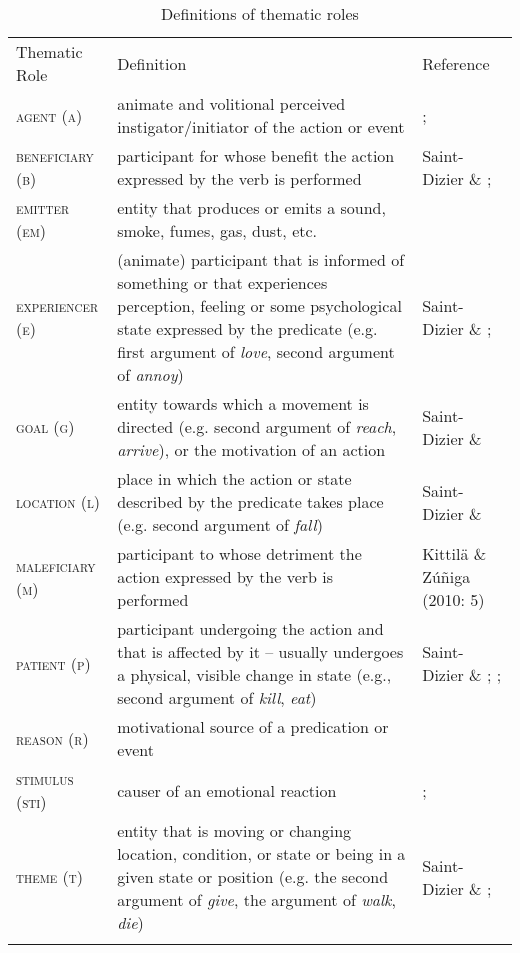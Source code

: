 \documentclass[output=paper]{langsci/langscibook}
\begin{document}
\begin{table}
\caption{Definitions of thematic roles}
\label{tab:1}

\begin{tabularx}{\textwidth}{XXX}
\lsptoprule
 {Thematic Role} & {Definition} & {Reference}\\
 {\textsc{agent (a)}} & {animate and volitional perceived instigator/initiator of the action or event} & {\citet{Fillmore1968}; \citet[49]{Payne1997}}\\
 {\textsc{beneficiary (b)}} & {participant for whose benefit the action expressed by the verb is performed} & {Saint-Dizier \& \citet[11]{Viegas1995}; \citet[4]{PalmerEtAl2010}}\\
 {\textsc{emitter (em)}} & {entity that produces or emits a sound, smoke, fumes, gas, dust, etc.} & \\
 {\textsc{experiencer (e)}} & {(animate) participant that is informed of something or that experiences perception, feeling or some psychological state expressed by the predicate (e.g. first argument of \textit{love}, second argument of \textit{annoy})} & {Saint-Dizier \& \citet[11]{Viegas1995}; \citet[113]{Lobner2002}}\\
 {\textsc{goal (g)}} & {entity towards which a movement is directed (e.g. second argument of \textit{reach}, \textit{arrive}), or the motivation of an action} & {Saint-Dizier \& \citet[11]{Viegas1995}}\\
 {\textsc{location (l)}} & {place in which the action or state described by the predicate takes place (e.g. second argument of \textit{fall})} & {Saint-Dizier \& \citet[11]{Viegas1995}}\\
 {\textsc{maleficiary (m)}} & {participant to whose detriment the action expressed by the verb is performed } & {Kittilä \& Zúñiga (2010: 5)}\\
 {\textsc{patient (p)}} & {participant undergoing the action and that is affected by it – usually undergoes a physical, visible change in state (e.g., second argument of \textit{kill}, \textit{eat}) } & {Saint-Dizier \& \citet[11]{Viegas1995}; \citet[4]{PalmerEtAl2010}; \citet[51]{Payne1997}}\\
 {\textsc{reason (r)}} & {motivational source of a predication or event} & {\citet[225]{Frawley1992}}\\
 {\textsc{stimulus (sti)}} & {causer of an emotional reaction} & {\citet[13]{PalmerEtAl2010}; \citet{Dowty1991}}\\
 {\textsc{theme (t)}} & {entity that is moving or changing location, condition, or state or being in a given state or position (e.g. the second argument of \textit{give}, the argument of \textit{walk}, \textit{die})} & {Saint-Dizier \& \citet[11]{Viegas1995}; \citet[4]{PalmerEtAl2010}}\\
\lspbottomrule
\end{tabularx}
\end{table}
\end{document}
